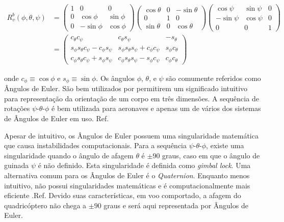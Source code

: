 \documentclass[a4paper, 12pt]{article}
\begin{document}
\begin{equation}
\begin{aligned}
{ R }_{ v }^{ b }(\phi, \theta, \psi) &= 
\begin{pmatrix} 
	1  & 0 & 0 \\
	0 & \cos {\phi}  &  \sin {\phi} \\
	0 & -\sin {\phi}  & \cos {\phi}	 
\end{pmatrix}
\begin{pmatrix} 
	\cos {\theta}  & 0 & -\sin {\theta} \\
	0  & 1 & 0 \\
	\sin {\theta}  & 0 & \cos  {\theta}	 
\end{pmatrix}
\begin{pmatrix} 
	\cos { \psi  }  & \sin { \psi  } & 0 \\
	 -\sin { \psi  }  & \cos { \psi  } & 0  \\ 
	 0  & 0 & 1 
\end{pmatrix} \\
&=\begin{pmatrix} 
{ c }_{ \theta  }{ c }_{ \psi  } & { c }_{ \theta  }s_{ \psi  } & -{ s }_{ \theta  } \\ { s }_{ \phi  }{ s }_{ \theta  }{ c }_{ \psi  }-{ c }_{ \phi  }{ s }_{ \psi  } & { s }_{ \phi  }{ s }_{ \theta  }{ s }_{ \psi  }+{ c }_{ \phi  }{ c }_{ \psi  } & { s }_{ \phi  }{ c }_{ \theta  } \\ { c }_{ \phi  }{ s }_{ \theta  }{ c }_{ \psi  }+{ s }_{ \phi  }{ s }_{ \psi  } & { c }_{ \phi  }{ s }_{ \theta  }{ s }_{ \psi  }-{ s }_{ \phi  }{ c }_{ \psi  } & { c }_{ \phi  }{ c }_{ \theta  } 
\end{pmatrix} 
\end{aligned}
\label{eq:rot2}
\end{equation}

\noindent onde ${ c }_{ \phi  }\equiv \cos { \phi  } $ e ${ s }_{ \phi  }\equiv \sin { \phi  } $. Os ângulos $\phi$, $\theta$, e $\psi$ são comumente referidos como Ângulos de Euler. São bem utilizados por permitirem um significado intuitivo para representação da orientação de um corpo em três dimensões. A sequência de rotações $\psi$-$\theta$-$\phi$ é bem utilizada para aeronaves e apenas um de vários dos sistemas de Ângulos de Euler em uso. Ref. 

Apesar de intuitivo, os Ângulos de Euler possuem uma singularidade matemática que causa instabilidades computacionais. Para a sequência $\psi$-$\theta$-$\phi$, existe uma singularidade quando o ângulo de afagem $\theta$ é $\pm90$ graus, caso em que o ângulo de guinada $\psi$ é não definido. Esta singularidade é definida como \textit{gimbal lock}. Uma alternativa comum para os Ângulos de Euler é o \textit{Quaternion}. Enquanto menos intuitivo, não possui singularidades matemáticas e é computacionalmente mais eficiente .Ref. Devido suas características, em voo comportado, a afagem do quadricóptero não chega a $\pm90$ graus e será aqui representada por Ângulos de Euler.
\end{document}
